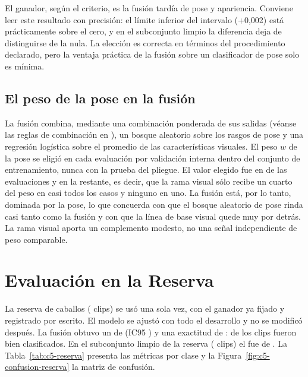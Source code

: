 El ganador, según el criterio, es la fusión tardía de pose y apariencia. Conviene leer este resultado con precisión: el límite inferior del intervalo (+0,002) está prácticamente sobre el cero, y en el subconjunto limpio la diferencia deja de distinguirse de la nula. La elección es correcta en términos del procedimiento declarado, pero la ventaja práctica de la fusión sobre un clasificador de pose solo es mínima.

\subsection{El peso de la pose en la fusión}
La fusión combina, mediante una combinación ponderada de sus salidas (véanse las reglas de combinación en \textcite{kittler1998}), un bosque aleatorio sobre los \PoseRasgos{} rasgos de pose y una regresión logística sobre el promedio de las características visuales. El peso $w$ de la pose se eligió en cada evaluación por validación interna dentro del conjunto de entrenamiento, nunca con la prueba del pliegue. El valor elegido fue \PesoPose{} en \PesoFoldsA{} de las \PesoFoldsTotal{} evaluaciones y \PesoPoseUno{} en la restante, es decir, que la rama visual sólo recibe un cuarto del peso en casi todos los casos y ninguno en uno. La fusión está, por lo tanto, dominada por la pose, lo que concuerda con que el bosque aleatorio de pose rinda casi tanto como la fusión y con que la línea de base visual quede muy por detrás. La rama visual aporta un complemento modesto, no una señal independiente de peso comparable.

\section{Evaluación en la Reserva}
La reserva de \CaballosReserva{} caballos (\ClipsReserva{} clips) se usó una sola vez, con el ganador ya fijado y registrado por escrito. El modelo se ajustó con todo el desarrollo y no se modificó después. La fusión obtuvo un \fmacro{} de \FusionReservaF{} (IC95 \FusionReservaIC{}) y una exactitud de \FusionReservaAcc{}: \ReservaAciertos{} de los \ClipsReserva{} clips fueron bien clasificados. En el subconjunto limpio de la reserva (\ClipsLimpioReserva{} clips) el \fmacro{} fue de \FusionReservaLimpio{}. La Tabla~\ref{tab:c5-reserva} presenta las métricas por clase y la Figura~\ref{fig:c5-confusion-reserva} la matriz de confusión.

